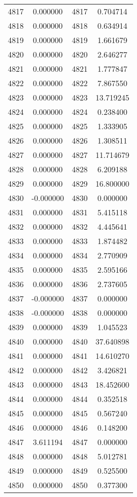 \documentclass[12pt]{article}
\begin{document}
\begin{longtable}{@{}cccc@{}}
4817 & 0.000000 & 4817 & 0.704714 \\
4818 & 0.000000 & 4818 & 0.634914 \\
4819 & 0.000000 & 4819 & 1.661679 \\
4820 & 0.000000 & 4820 & 2.646277 \\
4821 & 0.000000 & 4821 & 1.777847 \\
4822 & 0.000000 & 4822 & 7.867550 \\
4823 & 0.000000 & 4823 & 13.719245 \\
4824 & 0.000000 & 4824 & 0.238400 \\
4825 & 0.000000 & 4825 & 1.333905 \\
4826 & 0.000000 & 4826 & 1.308511 \\
4827 & 0.000000 & 4827 & 11.714679 \\
4828 & 0.000000 & 4828 & 6.209188 \\
4829 & 0.000000 & 4829 & 16.800000 \\
4830 & -0.000000 & 4830 & 0.000000 \\
4831 & 0.000000 & 4831 & 5.415118 \\
4832 & 0.000000 & 4832 & 4.445641 \\
4833 & 0.000000 & 4833 & 1.874482 \\
4834 & 0.000000 & 4834 & 2.770909 \\
4835 & 0.000000 & 4835 & 2.595166 \\
4836 & 0.000000 & 4836 & 2.737605 \\
4837 & -0.000000 & 4837 & 0.000000 \\
4838 & -0.000000 & 4838 & 0.000000 \\
4839 & 0.000000 & 4839 & 1.045523 \\
4840 & 0.000000 & 4840 & 37.640898 \\
4841 & 0.000000 & 4841 & 14.610270 \\
4842 & 0.000000 & 4842 & 3.426821 \\
4843 & 0.000000 & 4843 & 18.452600 \\
4844 & 0.000000 & 4844 & 0.352518 \\
4845 & 0.000000 & 4845 & 0.567240 \\
4846 & 0.000000 & 4846 & 0.148200 \\
4847 & 3.611194 & 4847 & 0.000000 \\
4848 & 0.000000 & 4848 & 5.012781 \\
4849 & 0.000000 & 4849 & 0.525500 \\
4850 & 0.000000 & 4850 & 0.377300 \\

\end{longtable}
\end{document}

